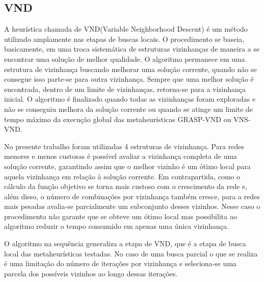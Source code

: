 \documentclass[12pt]{article}
\begin{document}
\subsection{VND}

A heurística chamada de VND(Variable Neighborhood Descent) é um método utilizado amplamente nas etapas de buscas locais. O procedimento se baseia, basicamente, em uma troca sistemática de estruturas vizinhanças de maneira a se encontrar uma solução de melhor qualidade. O algoritmo permanece em uma estrutura de vizinhança buscando melhorar uma solução corrente, quando não se consegue isso parte-se para outra vizinhança. Sempre que uma melhor solução é encontrada, dentro de um limite de vizinhanças, retorna-se para a vizinhança inicial. O algoritmo é finalizado quando todas as vizinhanças foram exploradas e não se conseguiu melhora da solução corrente ou quando se atinge um limite de tempo máximo da execução global das metaheurísticas GRASP-VND ou VNS-VND.

No presente trabalho foram utilizadas 4 estruturas de vizinhança. Para redes menores e menos custosas é possível avaliar a vizinhança completa de uma solução corrente, garantindo assim que o melhor vizinho é um ótimo local para aquela vizinhança em relação à solução corrente. Em contrapartida, como o cálculo da função objetivo se torna mais custoso com o crescimento da rede e, além disso, o número de combinações por vizinhança também cresce, para a redes mais pesadas avalia-se parcialmente um subconjunto desses vizinhos. Nesse caso o procedimento não garante que se obteve um ótimo local mas possibilita ao algoritmo reduzir o tempo consumido em apenas uma única vizinhança.

O algoritmo na sequência generaliza a etapa de VND, que é a etapa de busca local das metaheurísticas testadas. No caso de uma busca parcial o que se realiza é uma limitação do número de iterações por vizinhança e seleciona-se uma parcela dos possíveis vizinhos ao longo dessas iterações. 
\end{document}
